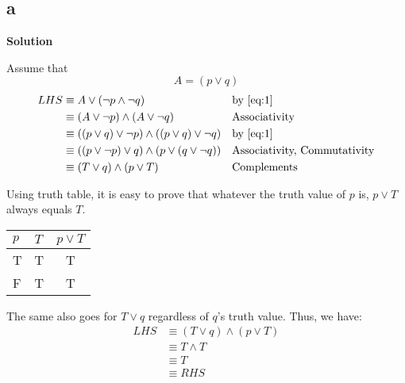 \subsection{a}
\textbf{Solution}

Assume that
\begin{equation}
\label{eq:1}
  A = (p \lor q)
\end{equation}
\begin{align*}
  LHS
  & \equiv A \lor (\neg p \land \neg q)
  && \text{by \eqref{eq:1}} \\
  & \equiv (A \lor \neg p) \land (A \lor \neg q)
  && \text{Associativity} \\
  & \equiv ((p \lor q) \lor \neg p) \land ((p \lor q) \lor \neg q)
  && \text{by \eqref{eq:1}} \\
  & \equiv ((p \lor \neg p) \lor q) \land (p \lor (q \lor \neg q))
  && \text{Associativity, Commutativity} \\
  & \equiv (T \lor q) \land (p \lor T)
  && \text{Complements}
\end{align*}

Using truth table, it is easy to prove that whatever the truth value of \(p\) is, \(p \lor T\) always equals \(T\).

\begin{center}
\begin{tabular}{|l|l|c|}
  \hline
  \(p\) & \(T\) & \(p \lor T\) \\
  \hline
  T & T & T  \\
  F & T & T  \\
  \hline
\end{tabular}
\end{center}

The same also goes for \(T \lor q\) regardless of \(q\)'s truth value. Thus, we have:
\begin{align*}
  LHS
  & \equiv (T \lor q) \land (p \lor T) \\
  & \equiv T \land T \\
  & \equiv T \\
  & \equiv RHS
\end{align*}


